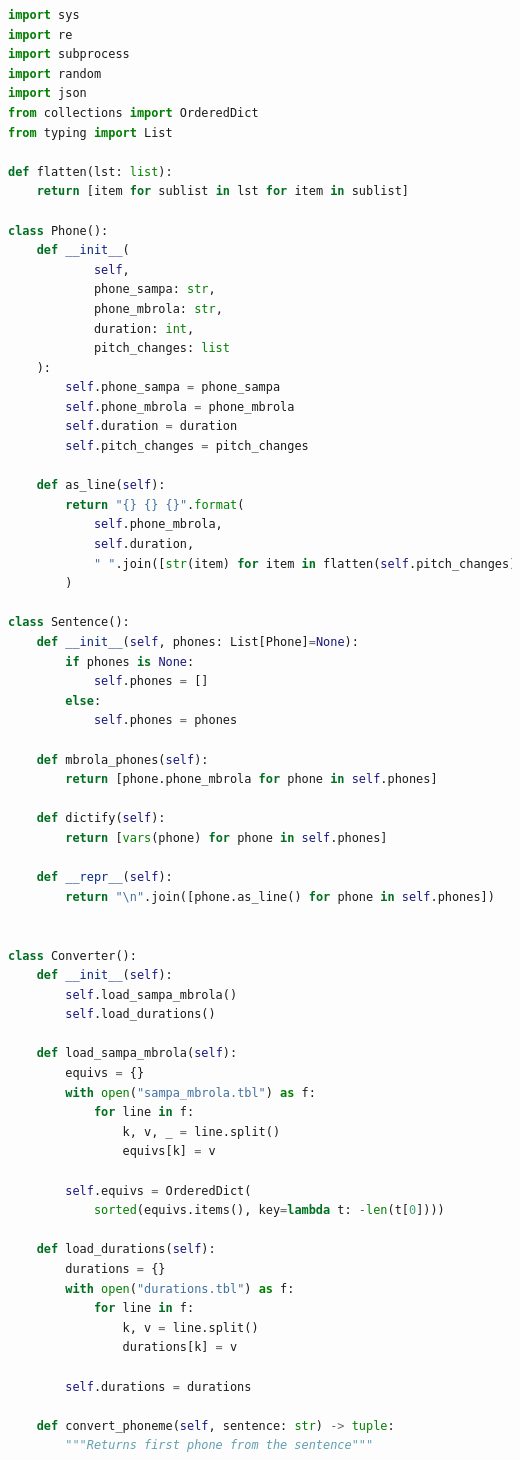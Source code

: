 \begin{lstlisting}[caption=Conversor eSpeakNG-MBROLA, label=conversao, language=Python]
import sys
import re
import subprocess
import random
import json
from collections import OrderedDict
from typing import List

def flatten(lst: list):
    return [item for sublist in lst for item in sublist]

class Phone():
    def __init__(
            self,
            phone_sampa: str,
            phone_mbrola: str,
            duration: int,
            pitch_changes: list
    ):
        self.phone_sampa = phone_sampa
        self.phone_mbrola = phone_mbrola
        self.duration = duration
        self.pitch_changes = pitch_changes

    def as_line(self):
        return "{} {} {}".format(
            self.phone_mbrola,
            self.duration,
            " ".join([str(item) for item in flatten(self.pitch_changes)])
        )

class Sentence():
    def __init__(self, phones: List[Phone]=None):
        if phones is None:
            self.phones = []
        else:
            self.phones = phones

    def mbrola_phones(self):
        return [phone.phone_mbrola for phone in self.phones]

    def dictify(self):
        return [vars(phone) for phone in self.phones]

    def __repr__(self):
        return "\n".join([phone.as_line() for phone in self.phones])


class Converter():
    def __init__(self):
        self.load_sampa_mbrola()
        self.load_durations()

    def load_sampa_mbrola(self):
        equivs = {}
        with open("sampa_mbrola.tbl") as f:
            for line in f:
                k, v, _ = line.split()
                equivs[k] = v

        self.equivs = OrderedDict(
            sorted(equivs.items(), key=lambda t: -len(t[0])))

    def load_durations(self):
        durations = {}
        with open("durations.tbl") as f:
            for line in f:
                k, v = line.split()
                durations[k] = v

        self.durations = durations

    def convert_phoneme(self, sentence: str) -> tuple:
        """Returns first phone from the sentence"""


\end{lstlisting}
